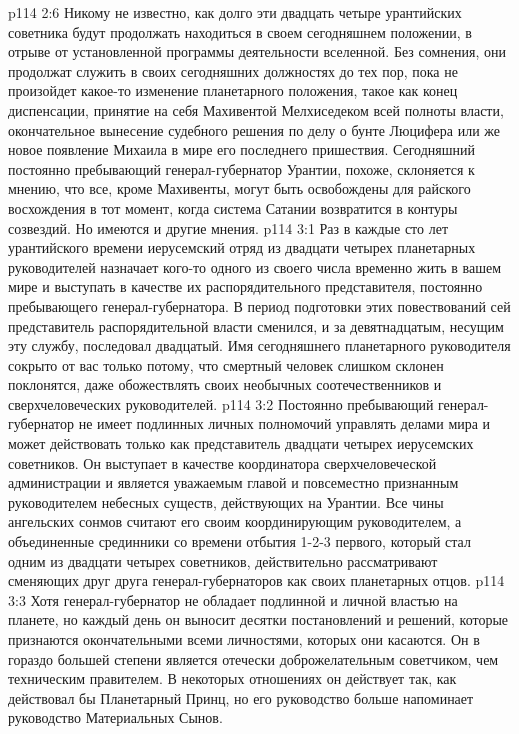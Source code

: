 \vs p114 2:6 Никому не известно, как долго эти двадцать четыре урантийских советника будут продолжать находиться в своем сегодняшнем положении, в отрыве от установленной программы деятельности вселенной. Без сомнения, они продолжат служить в своих сегодняшних должностях до тех пор, пока не произойдет какое\hyp{}то изменение планетарного положения, такое как конец диспенсации, принятие на себя Махивентой Мелхиседеком всей полноты власти, окончательное вынесение судебного решения по делу о бунте Люцифера или же новое появление Михаила в мире его последнего пришествия. Сегодняшний постоянно пребывающий генерал\hyp{}губернатор Урантии, похоже, склоняется к мнению, что все, кроме Махивенты, могут быть освобождены для райского восхождения в тот момент, когда система Сатании возвратится в контуры созвездий. Но имеются и другие мнения.
\vs p114 3:1 Раз в каждые сто лет урантийского времени иерусемский отряд из двадцати четырех планетарных руководителей назначает кого\hyp{}то одного из своего числа временно жить в вашем мире и выступать в качестве их распорядительного представителя, постоянно пребывающего генерал\hyp{}губернатора. В период подготовки этих повествований сей представитель распорядительной власти сменился, и за девятнадцатым, несущим эту службу, последовал двадцатый. Имя сегодняшнего планетарного руководителя сокрыто от вас только потому, что смертный человек слишком склонен поклонятся, даже обожествлять своих необычных соотечественников и сверхчеловеческих руководителей.
\vs p114 3:2 Постоянно пребывающий генерал\hyp{}губернатор не имеет подлинных личных полномочий управлять делами мира и может действовать только как представитель двадцати четырех иерусемских советников. Он выступает в качестве координатора сверхчеловеческой администрации и является уважаемым главой и повсеместно признанным руководителем небесных существ, действующих на Урантии. Все чины ангельских сонмов считают его своим координирующим руководителем, а объединенные срединники со времени отбытия 1\hyp{}2\hyp{}3 первого, который стал одним из двадцати четырех советников, действительно рассматривают сменяющих друг друга генерал\hyp{}губернаторов как своих планетарных отцов.
\vs p114 3:3 Хотя генерал\hyp{}губернатор не обладает подлинной и личной властью на планете, но каждый день он выносит десятки постановлений и решений, которые признаются окончательными всеми личностями, которых они касаются. Он в гораздо большей степени является отечески доброжелательным советчиком, чем техническим правителем. В некоторых отношениях он действует так, как действовал бы Планетарный Принц, но его руководство больше напоминает руководство Материальных Сынов.
